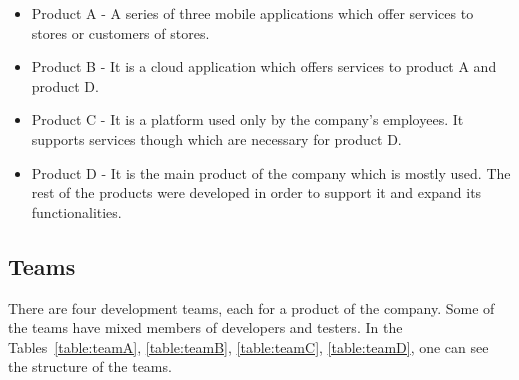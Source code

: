 \begin{itemize}
\item Product A - A series of three mobile applications which offer services to stores or customers of stores.
\item Product B - It is a cloud application which offers services to product A and product D.
\item Product C - It is a platform used only by the company's employees. It supports services though which are necessary for product D.
\item Product D - It is the main product of the company which is mostly used. The rest of the products were developed in order to support it and expand its functionalities.

\end{itemize}

\subsection{Teams}
There are four development teams, each for a product of the company. Some of the teams have mixed members of developers and testers. In the Tables~\ref{table:teamA}, \ref{table:teamB}, \ref{table:teamC}, \ref{table:teamD}, one can see the structure of the teams. \\

